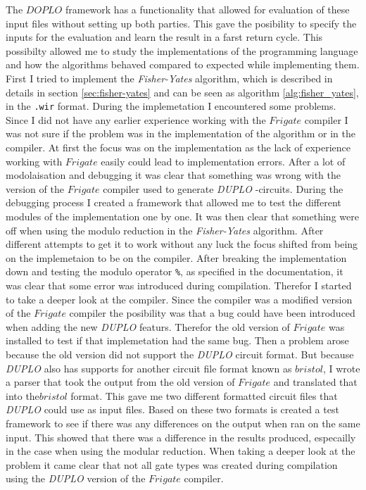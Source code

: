 \documentclass[twoside,11pt,openright]{report}
\newcommand{\FY}{\textit{Fisher-Yates} }
\newcommand{\DUPLO}{\textit{DUPLO} }
\begin{document}
The $DOPLO$ framework has a functionality that allowed for evaluation of these input files without setting up both parties. This gave the posibility to specify the inputs for the evaluation and learn the result in a farst return cycle. This possibilty allowed me to study the implementations of the programming language and how the algorithms behaved compared to expected while implementing them. First I tried to implement the \FY algorithm, which is described in details in section \ref{sec:fisher-yates} and can be seen as algorithm \ref{alg:fisher_yates}, in the \verb|.wir| format. During the implemetation I encountered some problems. Since I did not have any earlier experience working with the $Frigate$ compiler I was not sure if the problem was in the implementation of the algorithm or in the compiler. At first the focus was on the implementation as the lack of experience working with $Frigate$ easily could lead to implementation errors. After a lot of modolaisation and debugging it was clear that something was wrong with the version of the $Frigate$ compiler used to generate \DUPLO-circuits. During the debugging process I created a framework that allowed me to test the different modules of the implementation one by one. It was then clear that something were off when using the modulo reduction in the \FY algorithm. After different attempts to get it to work without any luck the focus shifted from being on the implemetaion to be on the compiler. After breaking the implementation down and testing the modulo operator \verb|%|, as specified in the documentation, it was clear that some error was introduced during compilation. Therefor I started to take a deeper look at the compiler. Since the compiler was a modified version of the $Frigate$ compiler the posibility was that a bug could have been introduced when adding the new \DUPLO featurs. Therefor the old version of $Frigate$ was installed to test if that implemetation had the same bug. Then a problem arose because the old version did not support the \DUPLO circuit format. But because \DUPLO also has  supports for another circuit file format known as $bristol$, I wrote a parser that took the output from the old version of $Frigate$ and translated that into the$bristol$ format. This gave me two different formatted circuit files that \DUPLO could use as input files. Based on these two formats is created a test framework to see if there was any differences on the output when ran on the same input. This showed that there was a difference in the results produced, especailly in the case when using the modular reduction. When taking a deeper look at the problem it came clear that not all gate types was created during compilation using the \DUPLO version of the $Frigate$ compiler.
\end{document}
